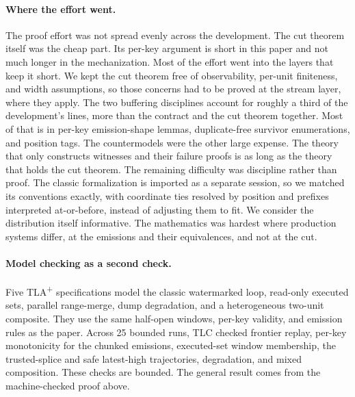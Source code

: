 \documentclass[sigconf,nonacm,10pt]{acmart}
\theoremstyle{plain}
\theoremstyle{definition}
\begin{document}
\paragraph{Where the effort went.}
The proof effort was not spread evenly across the development. The
cut theorem itself was the cheap part. Its per-key argument is
short in this paper and not much longer in the mechanization. Most
of the effort went into the layers that keep it short. We kept the
cut theorem free of observability, per-unit finiteness, and width
assumptions, so those concerns had to be proved at the stream layer,
where they apply. The two buffering disciplines account for
roughly a third of the development's lines, more than the contract
and the cut theorem together. Most of that is in per-key emission-shape
lemmas, duplicate-free survivor enumerations, and position tags.
The countermodels were the other large expense. The theory that
only constructs witnesses and their failure proofs is as long as
the theory that holds the cut theorem. The remaining difficulty
was discipline rather than proof. The classic formalization is
imported as a separate session, so we matched its conventions exactly, with
coordinate ties resolved by position and prefixes interpreted
at-or-before, instead of adjusting them to fit. We consider the
distribution itself informative. The mathematics was hardest
where production systems differ, at the emissions and their
equivalences, and not at the cut.

\paragraph{Model checking as a second check.}
Five TLA\textsuperscript{+} specifications model the classic
watermarked loop, read-only executed sets, parallel range-merge,
dump degradation, and a heterogeneous two-unit composite. They use
the same half-open windows, per-key validity, and emission rules as
the paper. Across 25 bounded runs, TLC checked frontier
replay, per-key monotonicity for the chunked emissions, executed-set
window membership, the trusted-splice and safe latest-high trajectories,
degradation, and
mixed composition. These checks are bounded. The general result comes
from the machine-checked proof above.
\end{document}
